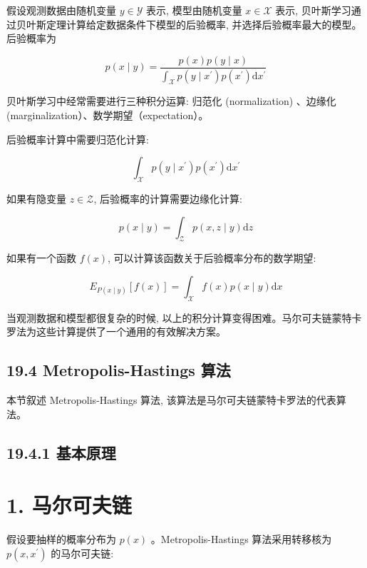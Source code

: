 \documentclass[10pt]{article}
\begin{document}
\begin{CJK*}{UTF8}{bsmi}
假设观测数据由随机变量 $y \in \mathcal{Y}$ 表示, 模型由随机变量 $x \in \mathcal{X}$ 表示, 贝叶斯学习通过贝叶斯定理计算给定数据条件下模型的后验概率, 并选择后验概率最大的模型。后验概率为


\begin{equation*}
p(x \mid y)=\frac{p(x) p(y \mid x)}{\int_{\mathcal{X}} p\left(y \mid x^{\prime}\right) p\left(x^{\prime}\right) \mathrm{d} x^{\prime}} \tag{19.34}
\end{equation*}


贝叶斯学习中经常需要进行三种积分运算: 归范化 (normalization) 、边缘化 (marginalization）、数学期望（expectation）。

后验概率计算中需要归范化计算:


\begin{equation*}
\int_{\mathcal{X}} p\left(y \mid x^{\prime}\right) p\left(x^{\prime}\right) \mathrm{d} x^{\prime} \tag{19.35}
\end{equation*}


如果有隐变量 $z \in \mathcal{Z}$, 后验概率的计算需要边缘化计算:


\begin{equation*}
p(x \mid y)=\int_{\mathcal{Z}} p(x, z \mid y) \mathrm{d} z \tag{19.36}
\end{equation*}


如果有一个函数 $f(x)$, 可以计算该函数关于后验概率分布的数学期望:


\begin{equation*}
E_{P(x \mid y)}[f(x)]=\int_{\mathcal{X}} f(x) p(x \mid y) \mathrm{d} x \tag{19.37}
\end{equation*}


当观测数据和模型都很复杂的时候, 以上的积分计算变得困难。马尔可夫链蒙特卡罗法为这些计算提供了一个通用的有效解决方案。

\subsection*{19.4 Metropolis-Hastings 算法}
本节叙述 Metropolis-Hastings 算法, 该算法是马尔可夫链蒙特卡罗法的代表算法。

\subsection*{19.4.1 基本原理}
\section*{1. 马尔可夫链}
假设要抽样的概率分布为 $p(x)$ 。Metropolis-Hastings 算法采用转移核为 $p\left(x, x^{\prime}\right)$ 的马尔可夫链:



\end{CJK*}
\end{document}
